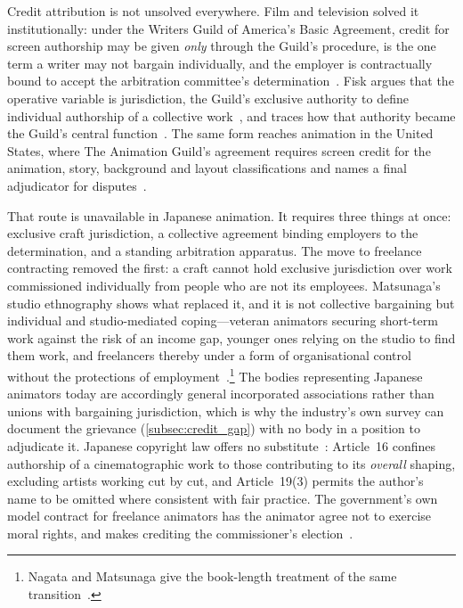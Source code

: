 Credit attribution is not unsolved everywhere. Film and television solved it
institutionally: under the Writers Guild of America's Basic Agreement, credit for screen
authorship may be given \emph{only} through the Guild's procedure, is the one term a writer
may not bargain individually, and the employer is contractually bound to accept the
arbitration committee's determination~\cite{wga2023mba}. Fisk argues that the operative
variable is jurisdiction, the Guild's exclusive authority to define individual authorship
of a collective work~\cite{fisk2010jurisdiction}, and traces how that authority became the
Guild's central function~\cite{fisk2012screencredit}. The same form reaches
animation in the United States, where The Animation Guild's agreement requires
screen credit for the animation, story, background and layout classifications and
names a final adjudicator for disputes~\cite{tag2024cba}.

That route is unavailable in Japanese animation. It requires three things at once:
exclusive craft jurisdiction, a collective agreement binding employers to the
determination, and a standing arbitration apparatus. The move to freelance contracting removed the first: a craft cannot hold exclusive
jurisdiction over work commissioned individually from people who are not its employees.
Matsunaga's studio ethnography shows what replaced it, and it is not collective bargaining
but individual and studio-mediated coping---veteran animators securing short-term work
against the risk of an income gap, younger ones relying on the studio to find them work,
and freelancers thereby under a form of organisational control without the protections of
employment~\cite{matsunaga2023portfolio}.\footnote{Nagata and Matsunaga give the book-length
treatment of the same transition~\cite{nagata2022sociology}.} The bodies representing
Japanese animators today are accordingly general incorporated associations rather than
unions with bargaining jurisdiction, which is why the industry's own survey can document
the grievance (\cref{subsec:credit_gap}) with no body in a position to adjudicate it.
Japanese copyright law offers no substitute~\cite{jp_copyright_act}: Article~16 confines
authorship of a cinematographic work to those contributing to its \emph{overall} shaping,
excluding artists working cut by cut, and Article~19(3) permits the author's name to be
omitted where consistent with fair practice. The government's own model contract for
freelance animators has the animator agree not to exercise moral rights, and makes
crediting the commissioner's election~\cite{bunka2024model}.


